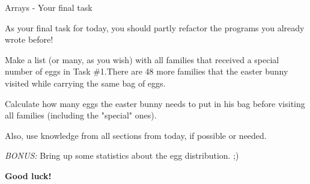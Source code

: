\begin{frame}[fragile]{Arrays - Your final task}

As your final task for today, you should partly refactor the programs you already wrote before! \pause

Make a list (or many, as you wish) with all families that received a special number of eggs in Task \#{}1.\pause There are 48 more families that the easter bunny visited while carrying the same bag of eggs. \pause

Calculate how many eggs the easter bunny needs to put in his bag before visiting all families (including the "special" ones). \pause

Also, use knowledge from all sections from today, if possible or needed. \pause

\emph{BONUS:} Bring up some statistics about the egg distribution. ;)

\textbf{Good luck!}

\end{frame}



